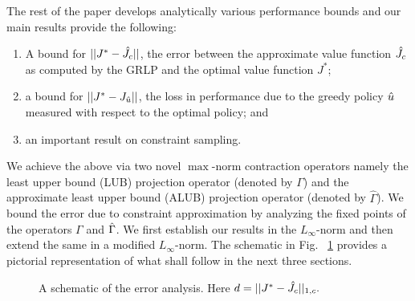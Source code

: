 \documentclass[12pt,draftcls,onecolumn]{IEEEtran}
\begin{document}
The rest of the paper develops analytically various performance bounds and our main results provide the following:
\begin{enumerate}
\item A bound for $||J^*-\hat{J}_c||$, the error between the approximate value function $\hat{J}_c$ as computed by the GRLP and the optimal value function $J^*$;
\item a bound for $||J^*-J_{\hat{u}}||$, the loss in performance due to the greedy policy $\hat{u}$ measured with respect to the optimal policy; and
\item an important result on constraint sampling.
\end{enumerate}
We achieve the above via two novel $\max$-norm contraction operators namely the least upper bound (LUB) projection operator (denoted by $\Gamma$) and the approximate least upper bound (ALUB) projection operator (denoted by $\hat{\Gamma}$). We bound the error due to constraint approximation by analyzing the fixed points of the operators $\Gamma$ and $\hat{\Gamma}$. We first establish our results in the $L_\infty$-norm and then extend the same in a modified $L_\infty$-norm. The schematic in Fig. ~\ref{schematic} provides a pictorial representation of what shall follow in the next three sections.
\FloatBarrier
\begin{figure}[h!]
\centering
\caption{A schematic of the error analysis. Here $d=||J^*-\hat{J}_c||_{1,c}.$}
\label{schematic}
\end{figure}
\end{document}
